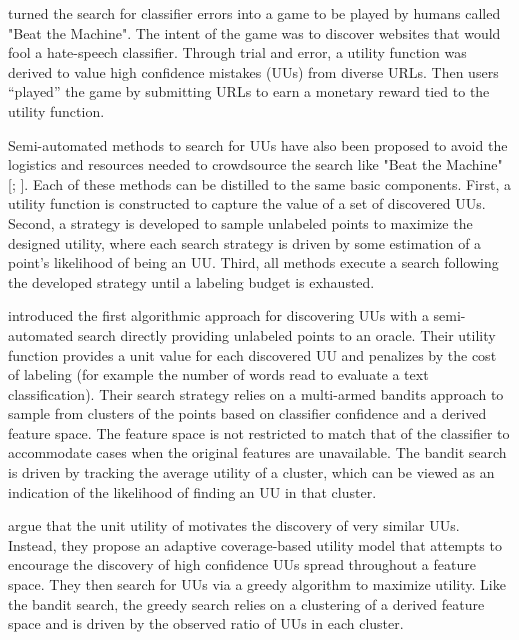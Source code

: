 \documentclass[conference]{IEEEtran}
\begin{document}
\citet{Attenberg2015} turned the search for classifier errors into a game to be played by humans called "Beat the Machine". The intent of the game was to discover websites that would fool a hate-speech classifier. Through trial and error, a utility function was derived to value high confidence mistakes (UUs) from diverse URLs. Then users ``played'' the game by submitting URLs to earn a monetary reward tied to the utility function. 

Semi-automated methods to search for UUs have also been proposed to avoid the logistics and resources needed to crowdsource the search like "Beat the Machine" [\citealt{Lakkaraju2016}; \citealt{Bansal2018}].  Each of these methods can be distilled to the same basic components.  First, a utility function is constructed to capture the value of a set of discovered UUs. Second, a strategy is developed to sample unlabeled points to maximize the designed utility, where each search strategy is driven by some estimation of a point's likelihood of being an UU.  Third, all methods execute a search following the developed strategy until a labeling budget is exhausted.

\citet{Lakkaraju2016} introduced the first algorithmic approach for discovering UUs with a semi-automated search directly providing unlabeled points to an oracle.  Their utility function provides a unit value for each discovered UU and penalizes by the cost of labeling (for example the number of words read to evaluate a text classification). Their search strategy relies on a multi-armed bandits approach to sample from clusters of the points based on classifier confidence and a derived feature space.  The feature space is not restricted to match that of the classifier to accommodate cases when the original features are unavailable.  The bandit search is driven by tracking the average utility of a cluster, which can be viewed as an indication of the likelihood of finding an UU in that cluster. 

\citet{Bansal2018} argue that the unit utility of \citet{Lakkaraju2016} motivates the discovery of very similar UUs. Instead, they propose an adaptive coverage-based utility model that attempts to encourage the discovery of high confidence UUs spread throughout a feature space. They then search for UUs via a greedy algorithm to maximize utility.  Like the bandit search, the greedy search relies on a clustering of a derived feature space and is driven by the observed ratio of UUs in each cluster. 
\end{document}
